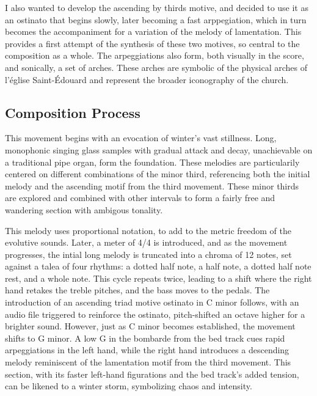 \documentclass[12pt,twoside,maitrise]{dms_ks}
\theoremstyle{definition}
\begin{document}
I also wanted to develop the ascending by thirds motive, and decided to use it as an ostinato that begins slowly, later becoming a fast arppegiation, which in turn becomes the accompaniment for a variation of the melody of lamentation.
This provides a first attempt of the synthesis of these two motives, so central to the composition as a whole.
The arpeggiations also form, both visually in the score, and sonically, a set of arches.
These arches are symbolic of the physical arches of l'église Saint-Édouard and represent the broader iconography of the church.

\subsection{Composition Process}

This movement begins with an evocation of winter's vast stillness.
Long, monophonic singing glass samples with gradual attack and decay, unachievable on a traditional pipe organ, form the foundation.
These melodies are particularily centered on different combinations of the minor third, referencing both the initial melody and the ascending motif from the third movement.
These minor thirds are explored and combined with other intervals to form a fairly free and wandering section with ambigous tonality.


This melody uses proportional notation, to add to the metric freedom of the evolutive sounds. Later, a meter of 4/4 is introduced, and as the movement progresses, the intial long melody is truncated into a chroma of 12 notes, set against a talea of four rhythms: a dotted half note, a half note, a dotted half note rest, and a whole note.
This cycle repeats twice, leading to a shift where the right hand retakes the treble pitches, and the bass moves to the pedals.
The introduction of an ascending triad motive ostinato in C minor follows, with an audio file triggered to reinforce the ostinato, pitch-shifted an octave higher for a brighter sound.
However, just as C minor becomes established, the movement shifts to G minor.
A low G in the bombarde from the bed track cues rapid arpeggiations in the left hand, while the right hand introduces a descending melody reminiscent of the lamentation motif from the third movement.
This section, with its faster left-hand figurations and the bed track's added tension, can be likened to a winter storm, symbolizing chaos and intensity.
\end{document}

